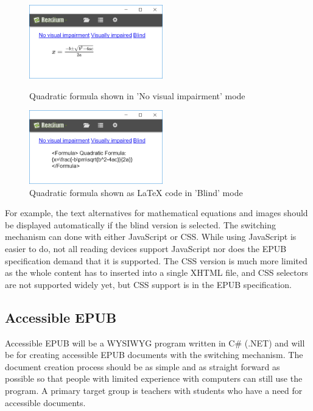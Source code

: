 \documentclass{llncs}
\begin{document}
\begin{figure}
	\centering
	\begin{minipage}{0.45\textwidth}
		\centering
			\includegraphics[width=58mm]{EquationNormal2.png} 
		\caption{Quadratic formula shown in 'No visual impairment' mode}
	\end{minipage}\hfill
	\begin{minipage}{0.45\textwidth}
		\centering
			\includegraphics[width=58mm]{EquationLatex2.png} 
		\caption{Quadratic formula shown as LaTeX code in 'Blind' mode}
	\end{minipage}

\end{figure}


For example, the text alternatives for mathematical equations and images should be displayed automatically if the blind version is selected.\cite{EPUB3bp} The switching mechanism can done with either JavaScript or CSS. While using JavaScript is easier to do, not all reading devices support JavaScript nor does the EPUB specification demand that it is supported. \cite{EPUB3bp} The CSS version is much more limited as the whole content has to inserted into a single XHTML file, and CSS selectors are not supported widely yet, but CSS support is in the EPUB specification.

\subsection{Accessible EPUB}
Accessible EPUB will be a WYSIWYG program written in C\# (.NET) and will be for creating accessible EPUB documents with the switching mechanism. The document creation process should be as simple and as straight forward as possible so that people with limited experience with computers can still use the program. A primary target group is teachers with students who have a need for accessible documents.
\end{document}
